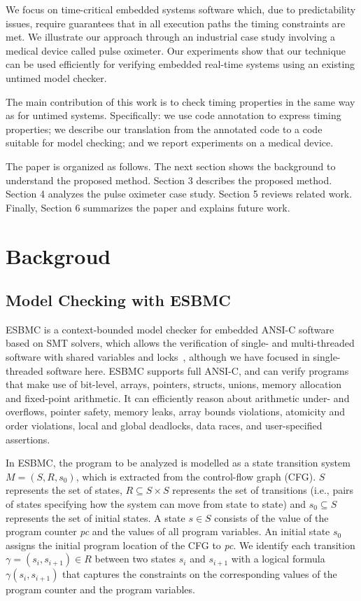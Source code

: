 \documentclass{llncs}
\begin{document}
We focus on time-critical embedded systems software which, due to predictability issues, 
require guarantees that in all execution paths
the timing constraints are met.
We illustrate our approach through an industrial case study
involving a medical device called pulse oximeter.  Our experiments show
that our technique can be used efficiently for verifying embedded real-time systems
using an existing untimed model checker.


The main contribution of this work is to check timing properties in the same way as for untimed systems. Specifically: 
we use code annotation to express timing properties; 
we describe our 
translation from the annotated code to a code suitable for model checking; and 
we report experiments
on a medical device.

The paper is organized as follows. 
The next section shows the background to understand the proposed method.
Section 3 describes the proposed method.
Section 4 analyzes the pulse oximeter case study.
Section 5 reviews related work.
Finally, Section 6 summarizes the paper and explains future work.



\section {Backgroud}

\subsection{Model Checking with ESBMC}

ESBMC is a context-bounded model checker for embedded ANSI-C software based on SMT solvers, which allows the verification of single- and multi-threaded 
software with shared variables and locks~\cite{Cordeiro09,cordeiro11}, although we have focused in single-threaded software here.
ESBMC supports full ANSI-C, and can verify programs that make use of bit-level, arrays, pointers, structs, unions, 
memory allocation and fixed-point arithmetic. It can efficiently reason about arithmetic under- and overflows, pointer safety, 
memory leaks, array bounds violations, atomicity and order violations, local and global deadlocks, data races, 
and user-specified assertions.

In ESBMC, the program to be analyzed is modelled as a state transition system $M = (S, R, s_{0})$, which is extracted from the control-flow graph (CFG). 
$S$ represents the set of states, $R \subseteq S \times S$ represents the set of transitions 
(i.e., pairs of states specifying how the system can move from state to state) 
and $s_{0} \subseteq S$ represents the set of initial states. 
A state $s \in S$ consists of the value  of the program counter \emph{pc} and the values of all program variables. 
An initial state $s_{0}$ assigns the initial program location of the CFG to \emph{pc}. 
We identify each transition $\gamma=(s_i,s_{i+1}) \in R$ between two states $s_{i}$ and $s_{i+1}$ 
with a logical formula $\gamma(s_i,s_{i+1})$ that captures the constraints on the corresponding values 
of the program counter and the program variables.
\end{document}
